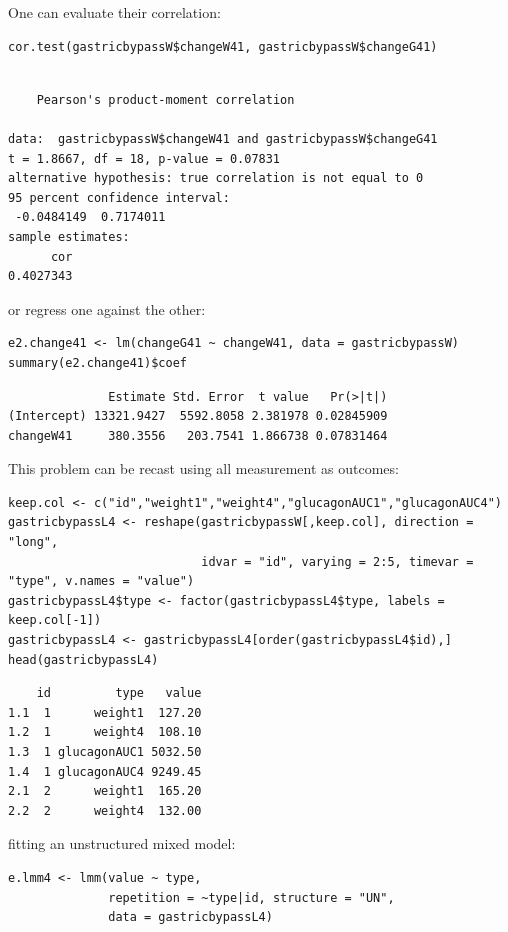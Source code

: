 \documentclass[12pt]{article}
\begin{document}
\clearpage

One can evaluate their correlation:
\lstset{language=r,label= ,caption= ,captionpos=b,numbers=none}
\begin{lstlisting}
cor.test(gastricbypassW$changeW41, gastricbypassW$changeG41)
\end{lstlisting}

\begin{verbatim}

	Pearson's product-moment correlation

data:  gastricbypassW$changeW41 and gastricbypassW$changeG41
t = 1.8667, df = 18, p-value = 0.07831
alternative hypothesis: true correlation is not equal to 0
95 percent confidence interval:
 -0.0484149  0.7174011
sample estimates:
      cor 
0.4027343
\end{verbatim}

or regress one against the other:
\lstset{language=r,label= ,caption= ,captionpos=b,numbers=none}
\begin{lstlisting}
e2.change41 <- lm(changeG41 ~ changeW41, data = gastricbypassW)
summary(e2.change41)$coef
\end{lstlisting}

\begin{verbatim}
              Estimate Std. Error  t value   Pr(>|t|)
(Intercept) 13321.9427  5592.8058 2.381978 0.02845909
changeW41     380.3556   203.7541 1.866738 0.07831464
\end{verbatim}


This problem can be recast using all measurement as outcomes:
\lstset{language=r,label= ,caption= ,captionpos=b,numbers=none}
\begin{lstlisting}
keep.col <- c("id","weight1","weight4","glucagonAUC1","glucagonAUC4")
gastricbypassL4 <- reshape(gastricbypassW[,keep.col], direction = "long",
                           idvar = "id", varying = 2:5, timevar = "type", v.names = "value")
gastricbypassL4$type <- factor(gastricbypassL4$type, labels = keep.col[-1])
gastricbypassL4 <- gastricbypassL4[order(gastricbypassL4$id),]
head(gastricbypassL4)
\end{lstlisting}

\begin{verbatim}
    id         type   value
1.1  1      weight1  127.20
1.2  1      weight4  108.10
1.3  1 glucagonAUC1 5032.50
1.4  1 glucagonAUC4 9249.45
2.1  2      weight1  165.20
2.2  2      weight4  132.00
\end{verbatim}


fitting an unstructured mixed model:
\lstset{language=r,label= ,caption= ,captionpos=b,numbers=none}
\begin{lstlisting}
e.lmm4 <- lmm(value ~ type,
              repetition = ~type|id, structure = "UN",
              data = gastricbypassL4)
\end{lstlisting}
\end{document}
